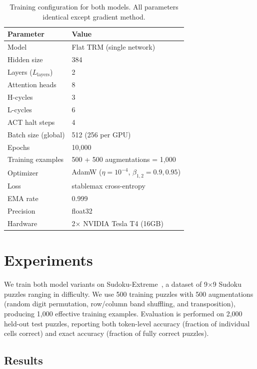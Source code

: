 \documentclass{article}
\begin{document}
\begin{table}[t]
\centering
\caption{Training configuration for both models. All parameters identical except gradient method.}
\label{tab:setup}
\begin{tabular}{ll}
\toprule
\textbf{Parameter} & \textbf{Value} \\
\midrule
Model & Flat TRM (single network) \\
Hidden size & 384 \\
Layers ($L_{\text{layers}}$) & 2 \\
Attention heads & 8 \\
H-cycles & 3 \\
L-cycles & 6 \\
ACT halt steps & 4 \\
Batch size (global) & 512 (256 per GPU) \\
Epochs & 10,000 \\
Training examples & 500 + 500 augmentations = 1,000 \\
Optimizer & AdamW ($\eta=10^{-4}$, $\beta_{1,2}=0.9,0.95$) \\
Loss & stablemax cross-entropy \\
EMA rate & 0.999 \\
Precision & float32 \\
Hardware & 2$\times$ NVIDIA Tesla T4 (16GB) \\
\bottomrule
\end{tabular}
\end{table}

\section{Experiments}

We train both model variants on Sudoku-Extreme~\cite{sapient2025sudoku}, a dataset of 9$\times$9 Sudoku puzzles ranging in difficulty. We use 500 training puzzles with 500 augmentations (random digit permutation, row/column band shuffling, and transposition), producing 1,000 effective training examples. Evaluation is performed on 2,000 held-out test puzzles, reporting both token-level accuracy (fraction of individual cells correct) and exact accuracy (fraction of fully correct puzzles).

\subsection{Results}
\end{document}
